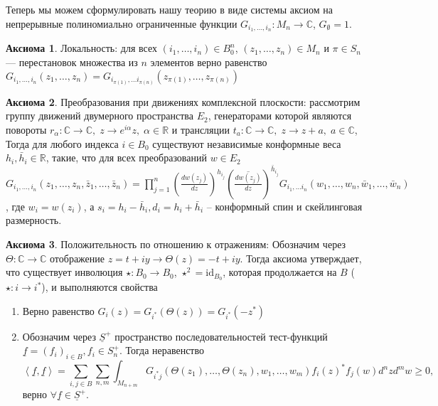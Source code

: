 \documentclass[a4paper,12pt]{article}
\theoremstyle{definition}
\newtheorem{axiom}{Аксиома}
\begin{document}
Теперь мы можем сформулировать нашу теорию в виде системы аксиом на
непрерывные полиномиально ограниченные функции $G_{i_1,\dots,
  i_n}:M_n\to \mathbb{C}$, $G_{\emptyset}=1$.
\begin{axiom}
  Локальность:   для всех $(i_{1},\dots,i_{n})\in B_{0}^{n}$,
  $(z_{1},\dots, z_{n})\in M_{n}$ и $\pi\in S_{n}$ --- перестановок
  множества из $n$ элементов верно равенство 
  $G_{i_{1},\dots,i_{n}}(z_{1},\dots,z_{n})=G_{i_{\pi(1)},\dots i_{\pi(n)}}(z_{\pi(1)},\dots, z_{\pi(n)})$
\end{axiom}
\begin{axiom}
  Преобразования при движениях комплексной плоскости: 
рассмотрим группу движений двумерного пространства $E_{2}$,
генераторами которой являются повороты
$r_{\alpha}:\mathbb{C}\to\mathbb{C}, \; z\to e^{i\alpha}z,\; \alpha\in
\mathbb{R}$ и трансляции $t_{a}:\mathbb{C}\to\mathbb{C},\; z\to z+a,\;
a\in\mathbb{C}$, 
Тогда для любого индекса $i\in B_{0}$  существуют независимые конформные веса $h_{i},\bar h_{i}\in \mathbb{R}$, такие, что для всех преобразований $w\in E_{2}$
  $G_{i_{1},\dots,i_{n}}(z_{1},\dots,z_{n},\bar z_{1},\dots, \bar z_{n})=
\prod_{j=1}^{n}\left(\frac{dw(z_{j})}{dz}\right)^{h_{i_{j}}}\left(\overline{\frac{dw(z_{j})}{dz}}\right)^{\bar{h}_{i_{j}}}
G_{i_1,\dots i_n}(w_{1},\dots, w_{n},\bar w_{1},\dots,\bar w_{n})$,
где $w_{i}=w(z_{i})$, а $s_{i}=h_{i}-\bar h_{i}, d_{i}=h_{i}+\bar
h_{i}$  -- конформный спин и скейлинговая размерность. 
\end{axiom}
\begin{axiom}
  Положительность по отношению к отражениям:
  Обозначим через $\Theta:\mathbb{C}\to\mathbb{C}$  отображение $z=t+i y\to \Theta(z)= -t+i y$. Тогда аксиома утверждает, что существует инволюция $\star:B_{0}\to B_{0}$, $\star^{2}=\mathrm{id}_{B_{0}}$, которая продолжается на $B$ ($\star:i\to i^{*}$), и выполняются свойства
  \begin{enumerate}
  \item Верно равенство $G_{i}(z)=G_{i^{*}}(\Theta(z))=G_{i^{*}}(-z^{*})$
  \item Обозначим через $\underline{S}^{+}$ пространство
    последовательностей тест-функций $\underline{f}=(f_{i})_{i\in B},
    f_{i}\in S^{+}_{n}$. Тогда неравенство
    $$\left<\underline{f},\underline{f}\right>=
      \sum_{i,j\in B}\sum_{n,m}\int_{M_{n+m}}G_{i^{*} j}(\Theta(z_{1}),\dots ,\Theta(z_{n}),w_{1},\dots,w_{m}) f_{i}(z)^{*}f_{j}(w) d^{n}z d^{m}w \geq 0,$$
      верно  $\forall \underline{f}\in \underline{S}^{+}$. 
  \end{enumerate}
\end{axiom}
\end{document}
